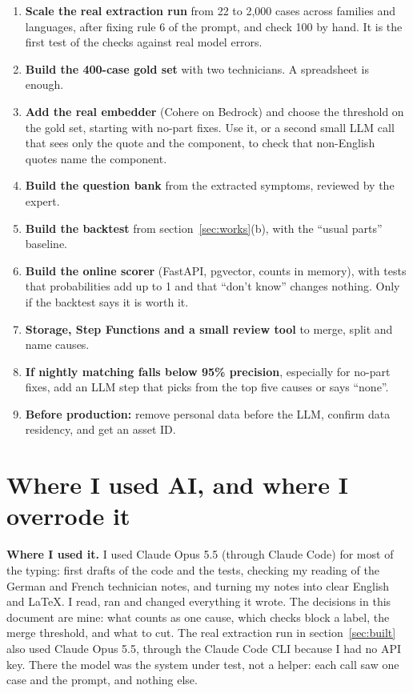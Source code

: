 \documentclass[11pt,a4paper]{article}
\begin{document}
\begin{enumerate}[itemsep=0.3em]
  \item \textbf{Scale the real extraction run} from 22 to 2,000 cases across families and languages, after fixing rule 6 of the prompt, and check 100 by hand. It is the first test of the checks against real model errors.
  \item \textbf{Build the 400-case gold set} with two technicians. A spreadsheet is enough.
  \item \textbf{Add the real embedder} (Cohere on Bedrock) and choose the threshold on the gold set, starting with no-part fixes. Use it, or a second small LLM call that sees only the quote and the component, to check that non-English quotes name the component.
  \item \textbf{Build the question bank} from the extracted symptoms, reviewed by the expert.
  \item \textbf{Build the backtest} from section~\ref{sec:works}(b), with the “usual parts” baseline.
  \item \textbf{Build the online scorer} (FastAPI, pgvector, counts in memory), with tests that probabilities add up to 1 and that “don't know” changes nothing. Only if the backtest says it is worth it.
  \item \textbf{Storage, Step Functions and a small review tool} to merge, split and name causes.
  \item \textbf{If nightly matching falls below 95\% precision}, especially for no-part fixes, add an LLM step that picks from the top five causes or says “none”.
  \item \textbf{Before production:} remove personal data before the LLM, confirm data residency, and get an asset ID.
\end{enumerate}

\section{Where I used AI, and where I overrode it}\label{sec:ai}

\textbf{Where I used it.} I used Claude Opus 5.5 (through Claude Code) for most of the typing: first drafts of the code and the tests, checking my reading of the German and French technician notes, and turning my notes into clear English and \LaTeX. I read, ran and changed everything it wrote. The decisions in this document are mine: what counts as one cause, which checks block a label, the merge threshold, and what to cut. The real extraction run in section~\ref{sec:built} also used Claude Opus 5.5, through the Claude Code CLI because I had no API key. There the model was the system under test, not a helper: each call saw one case and the prompt, and nothing else.
\end{document}
